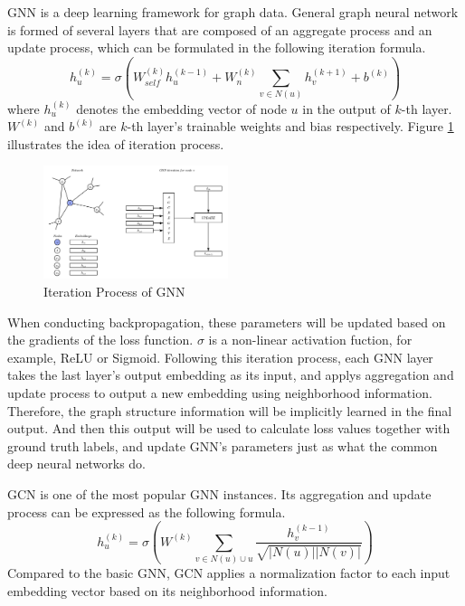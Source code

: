 \documentclass[sigconf]{acmart}
\begin{document}
GNN is a deep learning framework for graph data. General graph neural network is formed of several layers that are composed of an aggregate process and an update process, which can be formulated in the following iteration formula.
$$h_u^{(k)}=\sigma\left(W_{self}^{(k)}h_u^{(k-1)}+W_n^{(k)}\sum_{v\in N(u)}h_v^{(k+1)}+b^{(k)}\right)$$
where $h_u^{(k)}$ denotes the embedding vector of node $u$ in the output of $k$-th layer. $W^{(k)}$ and $b^{(k)}$ are $k$-th layer's trainable weights and bias respectively. Figure \ref{gnn} illustrates the idea of iteration process. 
\begin{figure}[!ht]
	\centering
	\includegraphics[width=0.48\textwidth]{./figs/gnn.png}
	\caption{Iteration Process of GNN}
	\label{gnn}
\end{figure}
When conducting backpropagation, these parameters will be updated based on the gradients of the loss function. $\sigma$ is a non-linear activation fuction, for example, ReLU or Sigmoid. Following this iteration process, each GNN layer takes the last layer’s output embedding as its input, and applys aggregation and update process to output a new embedding using neighborhood information. Therefore, the graph structure information will be implicitly learned in the final output. And then this output will be used to calculate loss values together with ground truth labels, and update GNN's parameters just as what the common deep neural networks do.

GCN is one of the most popular GNN instances. Its aggregation and update process can be expressed as the following formula. 
$$h_u^{(k)}=\sigma \left(W^{(k)}\sum_{v\in N(u)\cup u}\frac{h_v^{(k-1)}}{\sqrt{|N(u)||N(v)|}}\right)$$ 
Compared to the basic GNN, GCN applies a normalization factor to each input embedding vector based on its neighborhood information.
\end{document}
